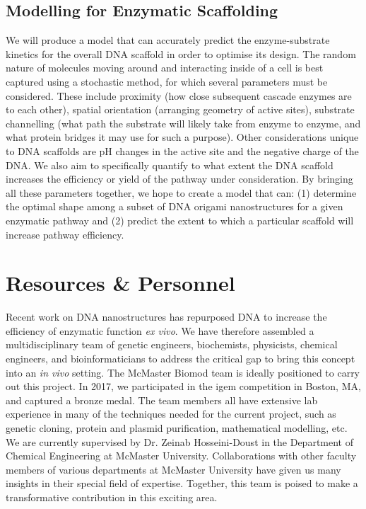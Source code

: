 \documentclass[a4paper]{article}
\begin{document}
\subsection*{Modelling for Enzymatic Scaffolding}
We will produce a model that can accurately predict the enzyme-substrate kinetics for the overall DNA scaffold in order to optimise its design.
The random nature of  molecules moving around and interacting inside of a cell is best captured using a stochastic method, for which several parameters must be considered\cite{meth5,meth6,meth7}.
These include proximity (how close subsequent cascade enzymes are to each other), spatial orientation (arranging geometry of active sites), substrate channelling (what path the substrate will likely take from enzyme to enzyme, and what protein bridges it may use for such a purpose)\cite{meth5,meth6}.
Other considerations unique to DNA scaffolds are pH changes in the active site and the negative charge of the DNA\cite{meth7}.
We also aim to specifically quantify to what extent the DNA scaffold increases the efficiency or yield of the pathway under consideration.
By bringing all these parameters together, we hope to create a model that can: (1) determine the optimal shape among a subset of DNA origami nanostructures for a given enzymatic pathway and (2) predict the extent to which a particular scaffold will increase pathway efficiency.
\section*{Resources \& Personnel}
Recent work on DNA nanostructures has repurposed DNA to increase the efficiency of enzymatic function \textit{ex vivo}.
We have therefore assembled a multidisciplinary team of genetic engineers, biochemists, physicists, chemical engineers, and bioinformaticians to address the critical gap to bring this concept into an \textit{in vivo} setting.
The McMaster Biomod team is ideally positioned to carry out this project.
In 2017, we participated in the \ac{igem} competition in Boston, MA, and captured a bronze medal.
The team members all have extensive lab experience in many of the techniques needed for the current project, such as genetic cloning, protein and plasmid purification, mathematical modelling, etc.
We are currently supervised by Dr. Zeinab Hosseini-Doust in the Department of Chemical Engineering at McMaster University.
Collaborations with other faculty members of various departments at McMaster University have given us many insights in their special field of expertise.
Together, this team is poised to make a transformative contribution in this exciting area.
\end{document}
